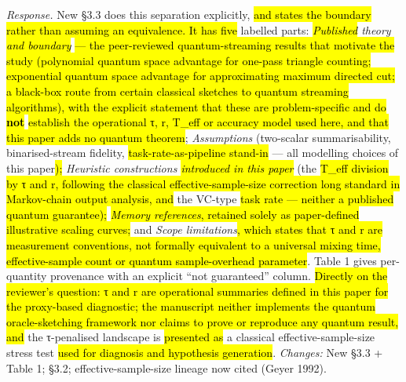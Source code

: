 \documentclass[
  11pt,
]{article}
\providecommand{\DIFadd}[1]{\hl{#1}} %
\providecommand{\DIFdel}[1]{} %
\providecommand{\DIFaddbegin}{} %
\providecommand{\DIFaddend}{} %
\providecommand{\DIFdelbegin}{} %
\providecommand{\DIFdelend}{} %
\providecommand{\DIFaddbegin}{}
\begin{document}
\emph{Response.} New §3.3 does this separation explicitly, \DIFdelbegin \DIFdel{in four
}\DIFdelend \DIFaddbegin \DIFadd{and states
the boundary rather than assuming an equivalence. It has five }\DIFaddend labelled
parts: \emph{\DIFdelbegin \DIFdel{Established }\DIFdelend \DIFaddbegin \DIFadd{Published }\DIFaddend theory \DIFaddbegin \DIFadd{and boundary}\DIFaddend } \DIFdelbegin \DIFdel{(the ×R overhead theorem,
O(n)-qubit memory,
task-specific O(N\^{}c) hardness --- all results of
the original framework, taken as given)}\DIFdelend \DIFaddbegin \DIFadd{--- the peer-reviewed
quantum-streaming results that motivate the study (polynomial quantum
space advantage for one-pass triangle counting; exponential quantum
space advantage for approximating maximum directed cut; a black-box
route from certain classical sketches to quantum streaming algorithms),
with the explicit statement that these are problem-specific and do
}\textbf{\DIFadd{not}} \DIFadd{establish the operational τ, r, T\_eff or accuracy model
used here, and that this paper adds no quantum theorem}\DIFaddend ;
\emph{Assumptions} (two-scalar summarisability, binarised-stream
fidelity, \DIFdelbegin \DIFdel{task-rate-as-pipeline-stand-in }\DIFdelend \DIFaddbegin \DIFadd{task-rate-as-pipeline stand-in }\DIFaddend --- all modelling choices of
this paper\DIFdelbegin \DIFdel{,
none inherited); }\DIFdelend \DIFaddbegin \DIFadd{); }\DIFaddend \emph{Heuristic constructions \DIFaddbegin \DIFadd{introduced in this paper}\DIFaddend }
(the \DIFdelbegin \DIFdel{τ division absent
from the framework's accounting; }\DIFdelend \DIFaddbegin \DIFadd{T\_eff division by τ and r, following the classical
effective-sample-size correction long standard in Markov-chain output
analysis, and }\DIFaddend the VC-type \DIFdelbegin \DIFdel{rate in place of
oracle-construction cost); }\DIFdelend \DIFaddbegin \DIFadd{task rate --- neither a published quantum
guarantee); }\emph{\DIFadd{Memory references}}\DIFadd{, retained solely as paper-defined
illustrative scaling curves; }\DIFaddend and \emph{Scope limitations}\DIFaddbegin \DIFadd{, which states
that τ and r are measurement conventions, not formally equivalent to a
universal mixing time, effective-sample count or quantum sample-overhead
parameter}\DIFaddend . Table 1 gives per-quantity provenance with an explicit ``not
guaranteed'' column. \DIFdelbegin \DIFdel{We
also now state the sharpest consequence: under the framework's own
r-only accounting, the Markov, seasonal, and long-memory regimes (r = 1)
incur zero overhead and no proxy--baseline crossover exists --- }\DIFdelend \DIFaddbegin \DIFadd{Directly on the reviewer's question: τ and r are
operational summaries defined in this paper for the proxy-based
diagnostic; the manuscript neither implements the quantum
oracle-sketching framework nor claims to prove or reproduce any quantum
result, and }\DIFaddend the τ-penalised landscape is \DIFaddbegin \DIFadd{presented as }\DIFaddend a classical
effective-sample-size stress test \DIFdelbegin \DIFdel{,
strictly more pessimistic than the framework's accounting, not a
rendering of it}\DIFdelend \DIFaddbegin \DIFadd{used for diagnosis and hypothesis
generation}\DIFaddend . \emph{Changes:} New §3.3 + Table 1; §3.2;
effective-sample-size lineage now cited (Geyer 1992).
\end{document}
